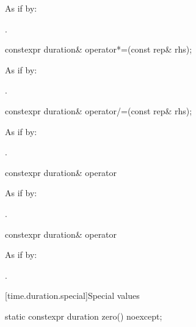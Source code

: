 \begin{itemdescr}
\pnum
\effects
As if by: 

\pnum
\returns
{}.
\end{itemdescr}

%
\begin{itemdecl}
constexpr duration& operator*=(const rep& rhs);
\end{itemdecl}

\begin{itemdescr}
\pnum
\effects
As if by: 

\pnum
\returns
{}.
\end{itemdescr}

%
\begin{itemdecl}
constexpr duration& operator/=(const rep& rhs);
\end{itemdecl}

\begin{itemdescr}
\pnum
\effects
As if by: 

\pnum
\returns
{}.
\end{itemdescr}

%
\begin{itemdecl}
constexpr duration& operator%
\end{itemdecl}

\begin{itemdescr}
\pnum
\effects
As if by: 

\pnum
\returns
{}.
\end{itemdescr}

%
\begin{itemdecl}
constexpr duration& operator%
\end{itemdecl}

\begin{itemdescr}
\pnum
\effects
As if by: 

\pnum
\returns
{}.
\end{itemdescr}


[time.duration.special]{Special values}

%
\begin{itemdecl}
static constexpr duration zero() noexcept;
\end{itemdecl}

